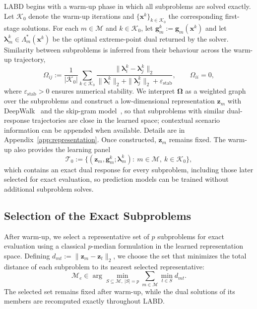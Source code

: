 LABD begins with a warm-up phase in which all subproblems are solved exactly. Let $\mathcal K_0$ denote the warm-up iterations and $\{\mathbf x^k\}_{k\in\mathcal K_0}$ the corresponding first-stage solutions. For each $m\in\mathcal M$ and $k\in\mathcal K_0$, let $\mathbf g_m^k:=\mathbf g_m(\mathbf x^k)$ and let $\boldsymbol\lambda_m^k\in\Lambda_m^*(\mathbf x^k)$ be the optimal extreme-point dual returned by the solver. Similarity between subproblems is inferred from their behaviour across the warm-up trajectory,
\begin{equation}\label{eq:omega}
\Omega_{ij}:=\frac{1}{|\mathcal K_0|}\sum_{k\in\mathcal K_0}\frac{\|\boldsymbol\lambda_i^k-\boldsymbol\lambda_j^k\|_2}{\|\boldsymbol\lambda_i^k\|_2+\|\boldsymbol\lambda_j^k\|_2+\varepsilon_{\mathrm{stab}}},
\qquad \Omega_{ii}=0,
\end{equation}
where $\varepsilon_{\mathrm{stab}}>0$ ensures numerical stability. We interpret $\boldsymbol\Omega$ as a weighted graph over the subproblems and construct a low-dimensional representation $\mathbf z_m$ with DeepWalk~\cite{perozzi2014deepwalk} and the skip-gram model~\cite{mikolov2013distributed}, so that subproblems with similar dual-response trajectories are close in the learned space; contextual scenario information can be appended when available. Details are in Appendix~\ref{app:representation}. Once constructed, $\mathbf z_m$ remains fixed. The warm-up also provides the learning panel
\begin{equation}\label{eq:panel}
\mathcal T_0:=\bigl\{(\mathbf z_m,\mathbf g_m^k;\boldsymbol\lambda_m^k):\ m\in\mathcal M,\ k\in\mathcal K_0\bigr\},
\end{equation}
which contains an exact dual response for every subproblem, including those later selected for exact evaluation, so prediction models can be trained without additional subproblem solves.


\subsection{Selection of the Exact Subproblems}
\label{subsec:selection}

After warm-up, we select a representative set of $p$
subproblems for exact evaluation using a classical
$p$-median formulation in the learned representation
space. Defining $d_{mt}:=\|\mathbf z_m-\mathbf z_t\|_2$,
we choose the set that minimizes the total distance
of each subproblem to its nearest selected representative:
\begin{equation}
\label{eq:pmedian}
\mathcal M_e\in
\arg\min_{S\subseteq\mathcal M,\ |S|=p}
\sum_{m\in\mathcal M}\min_{t\in S}d_{mt}.
\end{equation}
The selected set remains fixed after warm-up, while
the dual solutions of its members are recomputed
exactly throughout LABD.

